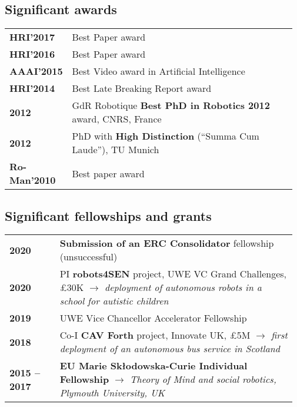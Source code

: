 \subsection{Significant awards}

\begin{tabular}{p{0.17\linewidth}p{0.8\linewidth}}
    \bf HRI'2017  & Best Paper award\\
    \bf HRI'2016  & Best Paper award\\
    \bf AAAI'2015  & Best Video award in Artificial Intelligence\\
    \bf HRI'2014  & Best Late Breaking Report award\\
    \bf 2012         & GdR Robotique {\bf Best PhD in Robotics 2012} award, CNRS, France \\
    \bf 2012         & PhD with {\bf High Distinction} (“Summa Cum Laude”), TU Munich\\
    \bf Ro-Man'2010  & Best paper award\\
\end{tabular}

\subsection{Significant fellowships and grants}

\begin{tabular}{p{0.17\linewidth}p{0.8\linewidth}}
    \bf 2020 & \textbf{Submission of an ERC Consolidator} fellowship (unsuccessful) \\
    \bf 2020 & PI \textbf{robots4SEN} project, UWE VC Grand Challenges, £30K
               \newline \emph{$\rightarrow$ deployment of autonomous robots in a school for autistic
               children}\\
    \bf 2019 & UWE Vice Chancellor Accelerator Fellowship \\
    \bf 2018 & Co-I \textbf{CAV Forth} project, Innovate UK, £5M 
               \newline \emph{$\rightarrow$ first deployment of an
               autonomous bus service in Scotland}\\
    \bf 2015 -- 2017 & {\bf EU Marie Skłodowska-Curie Individual Fellowship}
    \newline \emph{$\rightarrow$ Theory of Mind and social robotics, Plymouth University, UK} \\
\end{tabular}

\vspace{2em}

